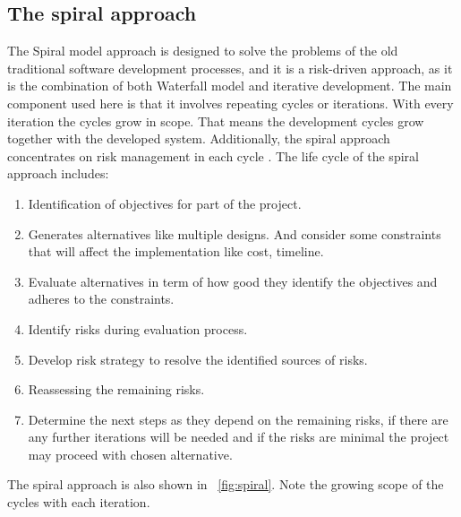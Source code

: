 \documentclass[conference,onecolumn]{IEEEtran}
\begin{document}
\subsection{The spiral approach}
The Spiral model approach is designed to solve the problems of the old traditional software development processes, and it is a risk-driven approach, as it is the combination of both Waterfall model and iterative development. The main component used here is that it involves repeating cycles or iterations.
With every iteration the cycles grow in scope. That means the development cycles grow together with the developed system.
Additionally, the spiral approach concentrates on risk management in each cycle \cite{a6}. The life cycle of the spiral approach includes:

\begin{enumerate}
	\item Identification of objectives for part of the project.
	\item Generates alternatives like multiple designs. And consider some constraints that will affect the implementation like cost, timeline.
	\item Evaluate alternatives in term of how good they identify the objectives and adheres to the constraints.
	\item Identify risks during evaluation process.
	\item Develop risk strategy to resolve the identified sources of risks.
	\item Reassessing the remaining risks.
	\item Determine the next steps as they depend on the remaining risks, if there are any further iterations will be needed and if the risks are minimal the project may proceed with chosen alternative.
\end{enumerate}

The spiral approach is also shown in \figurename~\ref{fig:spiral}. Note the growing scope of the cycles with each iteration.
\end{document}
